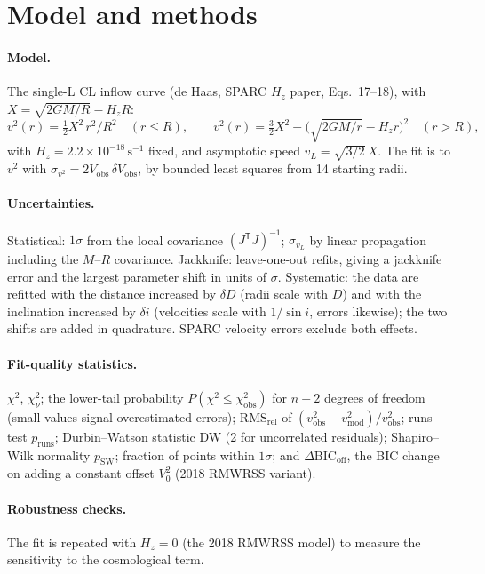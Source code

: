 \documentclass[10pt]{article}
\begin{document}
\section{Model and methods}
\paragraph{Model.} The single-L CL inflow curve (de Haas, SPARC $H_z$ paper, Eqs.~17--18), with $X=\sqrt{2GM/R}-H_zR$:
\begin{equation*}
v^2(r)=\tfrac12X^2\,r^2/R^2\quad(r\le R),\qquad v^2(r)=\tfrac32X^2-\bigl(\sqrt{2GM/r}-H_zr\bigr)^2\quad(r>R),
\end{equation*}
with $H_z=2.2\times10^{-18}\,\mathrm{s^{-1}}$ fixed, and asymptotic speed $v_L=\sqrt{3/2}\,X$. The fit is to $v^2$ with $\sigma_{v^2}=2V_\mathrm{obs}\,\delta V_\mathrm{obs}$, by bounded least squares from 14 starting radii.
\paragraph{Uncertainties.} Statistical: $1\sigma$ from the local covariance $(J^\mathsf{T}J)^{-1}$; $\sigma_{v_L}$ by linear propagation including the $M$--$R$ covariance. Jackknife: leave-one-out refits, giving a jackknife error and the largest parameter shift in units of $\sigma$. Systematic: the data are refitted with the distance increased by $\delta D$ (radii scale with $D$) and with the inclination increased by $\delta i$ (velocities scale with $1/\sin i$, errors likewise); the two shifts are added in quadrature. SPARC velocity errors exclude both effects.
\paragraph{Fit-quality statistics.} $\chi^2$, $\chi^2_\nu$; the lower-tail probability $P(\chi^2\le\chi^2_\mathrm{obs})$ for $n-2$ degrees of freedom (small values signal overestimated errors); $\mathrm{RMS_{rel}}$ of $(v^2_\mathrm{obs}-v^2_\mathrm{mod})/v^2_\mathrm{obs}$; runs test $p_\mathrm{runs}$; Durbin--Watson statistic DW (2 for uncorrelated residuals); Shapiro--Wilk normality $p_\mathrm{SW}$; fraction of points within $1\sigma$; and $\Delta\mathrm{BIC}_\mathrm{off}$, the BIC change on adding a constant offset $V_0^2$ (2018 RMWRSS variant).
\paragraph{Robustness checks.} The fit is repeated with $H_z=0$ (the 2018 RMWRSS model) to measure the sensitivity to the cosmological term.
\end{document}
